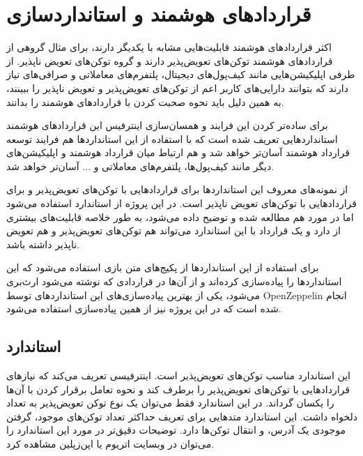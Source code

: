 \section{قرارداد‌های هوشمند و استانداردسازی}
اکثر قرارداد‌های هوشمند قابلیت‌هایی مشابه با یکدیگر دارند، برای مثال گروهی از قرارداد‌های هوشمند توکن‌های تعویض‌پذیر دارند و گروه توکن‌های تعویض ناپذیر. از طرفی اپلیکیشن‌هایی مانند کیف‌پول‌های دیجیتال، پلتفرم‌های معاملاتی و صرافی‌های نیاز دارند که بتوانند دارایی‌های کاربر اعم از توکن‌های تعویض‌پذیر و تعویض ناپذیر را ببینند، به همین دلیل باید نحوه صحبت کردن با قراردادهای هوشمند را بدانند.

برای ساده‌تر کردن این فرایند و همسان‌سازی اینترفیس  این قراردادهای هوشمند استانداردهایی تعریف شده است که با استفاده از این استانداردها هم فرایند توسعه قرارداد هوشمند آسان‌تر خواهد شد و هم ارتباط میان قرارداد هوشمند و اپلیکیشن‌های دیگر مانند کیف‌پول‌ها، پلتفرم‌های معاملاتی و ... آسان‌تر خواهد شد.

از نمونه‌های معروف این استانداردها
برای قرارداد‌هایی با توکن‌های تعویض‌پذیر و
برای قراردادهایی با توکن‌های تعویض ناپذیر است. در این پروژه از استاندارد
استفاده می‌شود اما در مورد
هم مطالعه شده و توضیح داده می‌شود، به طور خلاصه
قابلیت‌های بیشتری از
دارد و یک قرارداد با این استاندارد می‌تواند هم توکن‌های تعویض‌پذیر و هم تعویض ناپذیر داشته باشد.

برای استفاده از این استاندارد‌ها از پکیج‌های متن بازی استفاده می‌شود که این استاندارد‌ها را پیاده‌سازی کرده‌اند و از آن‌ها در قراردادی که نوشته می‌شود ارث‌بری می‌شود، یکی از بهترین پیاده‌سازی‌های این استاندارد‌های توسط
\gls{OpenZeppelin}
انجام شده است که در این پروژه نیز از همین پیاده‌سازی استفاده می‌شود.

\subsection{استاندارد }
این استاندارد مناسب توکن‌های تعویض‌پذیر است. اینترفیسی تعریف می‌کند که نیازهای قراردادهایی با توکن‌های تعویض‌پذیر را برطرف کند و نحوه تعامل برقرار کردن با آن‌ها را یکسان گرداند. در این استاندارد فقط می‌توان یک نوع توکن تعویض‌پذیر به تعداد دلخواه داشت. این استاندارد متدهایی برای تعریف حداکثر تعداد توکن‌های موجود، گرفتن موجودی یک آدرس، و انتقال توکن‌ها دارد. توضیحات دقیق‌تر در مورد این استاندارد را می‌توان در وبسایت
اتریوم
یا اپن‌زپلین
مشاهده کرد.

